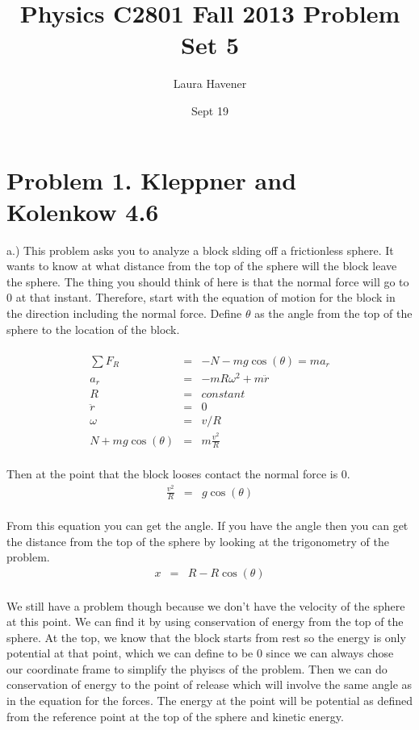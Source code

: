 \documentclass[11pt]{amsart}
\title{Physics C2801 Fall 2013 Problem Set 5}
\author{Laura Havener}
\date{Sept 19} %
\begin{document}
\maketitle

\section{Problem 1. Kleppner and Kolenkow 4.6}
a.) This problem asks you to analyze a block slding off a frictionless sphere. It wants to know at what distance from the top of the sphere will the block leave the sphere. The thing you should think of here is that the normal force will go to 0 at that instant. Therefore, start with the equation of motion for the block in the direction including the normal force. Define $\theta$ as the angle from the top of the sphere to the location of the block. \\ \\
\begin{eqnarray*}
\sum{F_{R}} &=& -N-mg\cos(\theta) = ma_{r} \\
a_{r} &=& -mR\omega^{2}+m\ddot{r} \\ 
R &=& constant \\
\ddot{r} &=& 0 \\
\omega &=& v/R \\
N+mg\cos(\theta) &=& m\frac{v^{2}}{R}
\end{eqnarray*} \\
Then at the point that the block looses contact the normal force is 0. \\
\begin{eqnarray*}
\frac{v^{2}}{R} &=& g\cos(\theta) 
\end{eqnarray*} \\
From this equation you can get the angle. If you have the angle then you can get the distance from the top of the sphere by looking at the trigonometry of the problem. \\
\begin{eqnarray*}
x &=& R-R\cos(\theta) 
\end{eqnarray*} \\
We still have a problem though because we don't have the velocity of the sphere at this point. We can find it by using conservation of energy from the top of the sphere. At the top, we know that the block starts from rest so the energy is only potential at that point, which we can define to be 0 since we can always chose our coordinate frame to simplify the phyiscs of the problem. Then we can do conservation of energy to the point of release which will involve the same angle as in the equation for the forces. The energy at the point will be potential as defined from the reference point at the top of the sphere and kinetic energy. \\ \\ 
\end{document}
